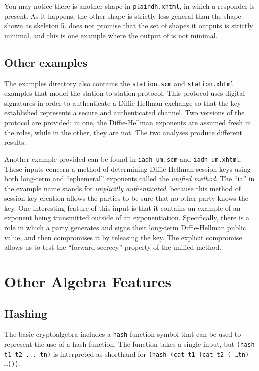  You may notice there is another
shape in \texttt{plaindh.xhtml}, in which a responder is present.  As it
happens, the other shape is strictly less general than the shape shown
as skeleton 5.  {\cpsa} does not promise that the set of shapes it
outputs is strictly minimal, and this is one example where the output
of {\cpsa} is not minimal.

\subsection{Other examples}

  The examples directory also contains the
\texttt{station.scm} and \texttt{station.xhtml} examples that model
the station-to-station protocol.  This protocol uses digital
signatures in order to authenticate a Diffie-Hellman exchange so that
the key established represents a secure and authenticated channel.
Two versions of the protocol are provided; in one, the Diffie-Hellman
exponents are assumed fresh in the roles, while in the other, they are
not.  The two analyses produce different results.

  Another example
provided can be found in \texttt{iadh-um.scm} and
\texttt{iadh-um.xhtml}.  These inputs concern a method of determining
Diffie-Hellman session keys using both long-term and ``ephemeral''
exponents called the \emph{unified method}.  The ``ia'' in the example
name stands for \emph{implicitly authenticated}, because this method
of session key creation allows the parties to be sure that no other
party knows the key.  One interesting feature of this input is that it
contains an example of an exponent being transmitted outside of an
exponentiation.  Specifically, there is a role in which a party
generates and signs their long-term Diffie-Hellman public value, and
then compromises it by releasing the key.  The explicit compromise
allows us to test the ``forward secrecy'' property of the unified
method.

\section{Other Algebra Features}
\label{sec:other_algebra}

\subsection{Hashing}
  The {\cpsa} basic cryptoalgebra
includes a \texttt{hash} function symbol that can be used to represent
the use of a hash function.  The function takes a single input, but
\texttt{(hash t1 t2 ... tn)} is interpreted as shorthand for
\texttt{(hash (cat t1 (cat t2 ( \ldots tn) \ldots )))}.

